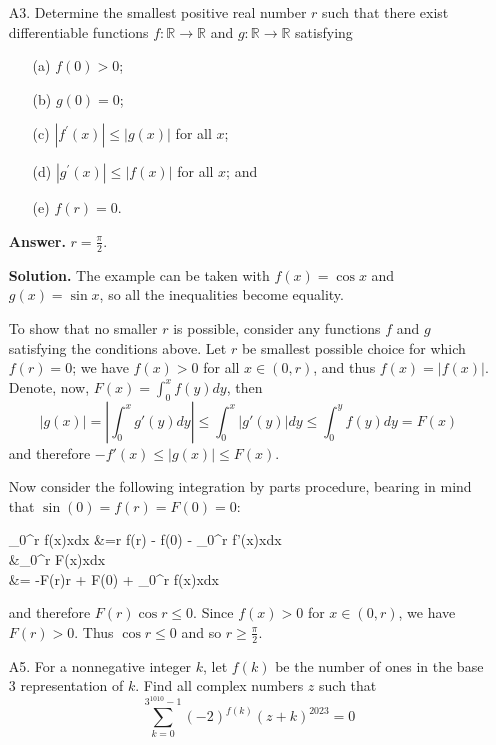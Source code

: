 \documentclass[11pt,a4paper]{article}
\begin{document}
\begin{enumerate}
		\item [A3.]
		Determine the smallest positive real number $r$ such that there exist differentiable functions $f: \mathbb{R} \rightarrow \mathbb{R}$ and $g: \mathbb{R} \rightarrow \mathbb{R}$ satisfying
		\begin{enumerate}
			\item [(a)] $f(0) > 0$; 
			
			\item [(b)] $g(0) = 0$; 
			
			\item[(c)] $\left|f^{\prime}(x)\right| \leq|g(x)|$ for all $x$; 
			
			\item[(d)] $\left|g^{\prime}(x)\right| \leq|f(x)|$ for all $x$; and
			
			\item[(e)] $f(r)=0$.
		\end{enumerate}
		
		\textbf{Answer.} $r = \frac{\pi}{2}$. 
		
		\textbf{Solution.} 
		The example can be taken with $f(x)=\cos x$ and $g(x) = \sin x$, 
		so all the inequalities become equality. 
		
		To show that no smaller $r$ is possible, consider any functions $f$ and $g$ satisfying the conditions above. 
		Let $r$ be smallest possible choice for which $f(r) = 0$; 
		we have $f(x) > 0$ for all $x\in (0, r)$, and thus $f(x) = |f(x)|$. 
		Denote, now, $F(x) = \int_0^x f(y)dy$, then 
		\[
		|g(x)|=\left| \int_0^x g'(y)dy\right|
		\le \int_0^x |g'(y)|dy \le \int_0^y f(y)dy = F(x)
		\]
		and therefore $-f'(x)\le |g(x)|\le F(x)$. 
		
		Now consider the following integration by parts procedure, 
		bearing in mind that $\sin(0)=f(r)=F(0)=0$: 
		\begin{flalign*}
			\int_0^r f(x)\cos xdx
			&=\sin r f(r) -  f(0) - \int_0^r f'(x)\sin xdx
			\\&\le \int_0^r F(x)\sin xdx
			\\&= -F(r)\cos r + F(0) + \int_0^r f(x)\cos xdx
		\end{flalign*}
	    and therefore $F(r)\cos r\le 0$. 
	    Since $f(x)> 0$ for $x\in (0, r)$, we have $F(r) > 0$. 
	    Thus $\cos r\le 0$ and so $r \ge \frac{\pi}{2}$. 
		
		\item [A5.]
		For a nonnegative integer $k$, let $f(k)$ be the number of ones in the base 3 representation of $k$. Find all complex numbers $z$ such that
		$$
		\sum_{k=0}^{3^{1010}-1}(-2)^{f(k)}(z+k)^{2023}=0
		$$
		

\end{enumerate}
\end{document}
